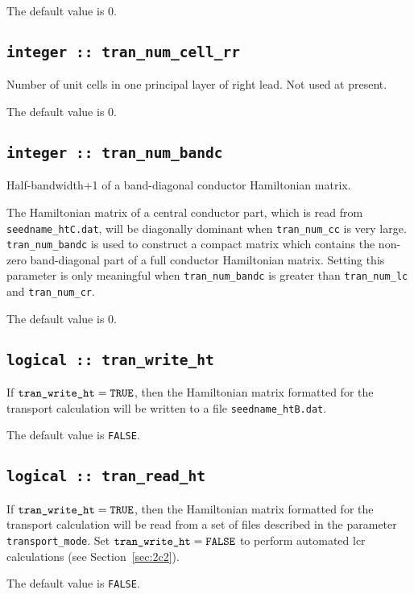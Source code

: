 The default value is 0. 
 
\subsection[tran\_num\_cell\_rr]{\tt integer :: tran\_num\_cell\_rr}
Number of unit cells in one principal layer of right lead. 
Not used at present.

The default value is 0.

\subsection[tran\_num\_bandc]{\tt integer :: tran\_num\_bandc}

Half-bandwidth+1 of a band-diagonal conductor Hamiltonian matrix.

The Hamiltonian matrix of a central conductor part, which is
read from \verb#seedname_htC.dat#, will be diagonally dominant
when \verb#tran_num_cc# is very large.
\verb#tran_num_bandc# is used to construct
a compact matrix which contains
the non-zero band-diagonal part of a full conductor Hamiltonian matrix. 
Setting this parameter is only meaningful when
\verb#tran_num_bandc# is greater than
\verb#tran_num_lc# and \verb#tran_num_cr#.

The default value is 0.

\subsection[tran\_write\_ht]{\tt logical :: tran\_write\_ht}

If $\verb#tran_write_ht#=\verb#TRUE#$, then the Hamiltonian matrix 
formatted for the transport calculation will be written 
to a file \verb#seedname_htB.dat#.

The default value is {\tt FALSE}.

\subsection[tran\_read\_ht]{\tt logical :: tran\_read\_ht}

If $\verb#tran_write_ht#=\verb#TRUE#$, then the Hamiltonian matrix
formatted for the transport calculation will be read
from a set of files described in the
parameter \verb#transport_mode#. 
Set $\verb#tran_write_ht#=\verb#FALSE#$ to perform automated 
lcr calculations (see Section~\ref{sec:2c2}).

The default value is {\tt FALSE}.

